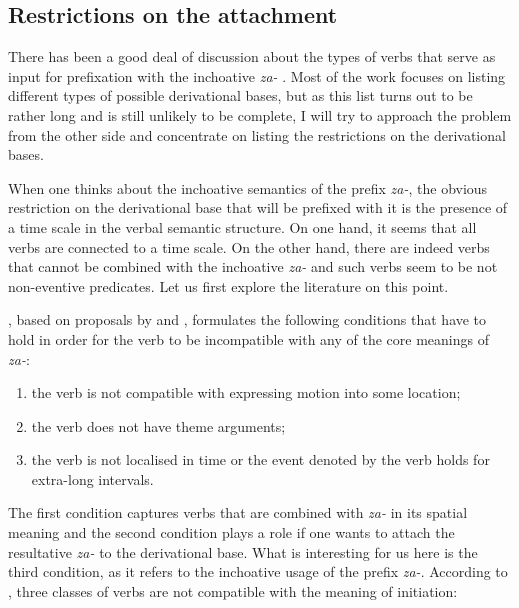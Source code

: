 \subsection{Restrictions on the attachment}
There has been a good deal of discussion about the types of verbs that serve as input for prefixation with the inchoative \textit{za-} \citep{Isachenko:60, Zemskaja:55, Sheljakin:69, Zaliznjak:95, Braginsky:08}. Most of the work focuses on listing different types of possible derivational bases, but as this list turns out to be rather long and is still unlikely to be complete, I will try to approach the problem from the other side and concentrate on listing the restrictions on the derivational bases.

When one thinks about the inchoative semantics of the prefix \textit{za-}, the obvious restriction on the derivational base that will be prefixed with it is the presence of a time scale in the verbal semantic structure. On one hand, it seems that all verbs are connected to a time scale. On the other hand, there are indeed verbs that cannot be combined with the inchoative \textit{za-} and such verbs seem to be not non-eventive predicates. Let us first explore the literature on this point.

\citet[275]{Braginsky:08}, based on proposals by \citet{Sheljakin:69} and \citet{Paducheva:96}, formulates the following conditions that have to hold in order for the verb to be incompatible with any of the core meanings of \textit{za-}:
\begin{enumerate}
\item the verb is not compatible with expressing motion into some location;
\item the verb does not have theme arguments;
\item the verb is not localised in time or the event denoted by the verb holds for extra-long intervals.
\end{enumerate}

The first condition captures verbs that are combined with \textit{za-} in its spatial meaning and the second condition plays a role if one wants to attach the resultative \textit{za-} to the derivational base. What is interesting for us here is the third condition, as it refers to the inchoative usage of the prefix \textit{za-}. According to \citet{Paducheva:96}, three classes of verbs are not compatible with the meaning of initiation:

